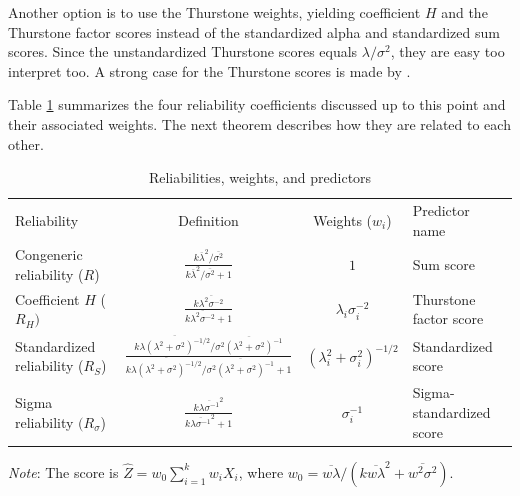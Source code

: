 \documentclass[twoside]{article}
\begin{document}
Another option is to use the Thurstone weights, yielding coefficient $H$ and the Thurstone factor scores instead of the standardized alpha and standardized sum scores. Since the unstandardized Thurstone scores equals $\lambda/\sigma^2$, they are easy too interpret too. A strong case for the Thurstone scores is made by \citet{McNeish2019-ea}.

Table \ref{tab:reliabilities} summarizes the four reliability coefficients discussed up to this point and their associated weights. The next theorem describes how they are related to each other. 

\begin{table}
\label{tab:reliabilities}
\noindent \begin{centering}
\caption{Reliabilities, weights, and predictors}
\begin{tabular}{lccl}
\toprule
 Reliability & Definition & Weights ($w_{i}$) & Predictor name\\
 \cmidrule{1-4}
Congeneric reliability ($R$) & $\frac{k\overline{\lambda}^{2}/\overline{\sigma^{2}}}{k\overline{\lambda}^{2}/\overline{\sigma^{2}}+1}$ & $1$ & Sum score \\[2ex]
Coefficient $H$ ($R_{H})$ & $\frac{k\overline{\lambda^{2}\sigma^{-2}}}{k\overline{\lambda^{2}\sigma^{-2}}+1}$ & $\lambda_{i}\sigma_{i}^{-2}$ & Thurstone factor score \\[2ex]
Standardized reliability ($R_{S}$) & $\frac{k\overline{\lambda(\lambda^{2}+\sigma^{2})^{-1/2}}/\overline{\sigma^{2}(\lambda^{2}+\sigma^{2})^{-1}}}{k\overline{\lambda(\lambda^{2}+\sigma^{2})^{-1/2}}/\overline{\sigma^{2}(\lambda^{2}+\sigma^{2})^{-1}}+1}$ & $(\lambda_{i}^{2}+\sigma_{i}^{2})^{-1/2}$ & Standardized score \\[2ex]
Sigma reliability $(R_{\sigma}$) & $\frac{k\overline{\lambda\sigma^{-1}}^{2}}{k\overline{\lambda\sigma^{-1}}^{2}+1}$ & $\sigma_{i}^{-1}$ & Sigma-standardized score \\[2ex]
\bottomrule
\end{tabular}
\par\end{centering}
\vskip7.0pt
\textit{Note}: The score is $\hat{Z} = w_{0}\sum_{i=1}^{k}w_iX_{i}$, where $w_0 = \overline{w\lambda}/(k\overline{w\lambda}^{2}+\overline{w^{2}\sigma^{2}})$.
\end{table}
\end{document}
